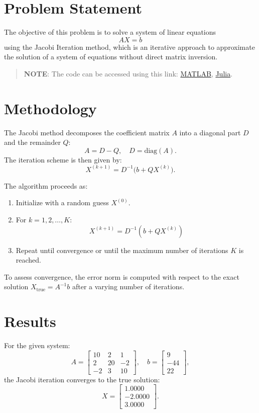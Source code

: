 \section*{Problem Statement}
The objective of this problem is to solve a system of linear equations
\[
  AX = b
\]
using the Jacobi Iteration method, which is an iterative approach to approximate the solution of a system of equations without direct matrix inversion.

\begin{quote}
  \textbf{NOTE}: The code can be accessed using this link: \href{https://raw.githubusercontent.com/HavokSahil/computational-techniques-assignments/refs/heads/main/assignment2/a4.m}{MATLAB}, \href{https://raw.githubusercontent.com/HavokSahil/computational-techniques-assignments/refs/heads/main/assignment2/a4.jl}{Julia}.
\end{quote}
\section*{Methodology}
The Jacobi method decomposes the coefficient matrix $A$ into a diagonal part $D$ and the remainder $Q$:
\[
  A = D - Q, \quad D = \text{diag}(A).
\]
The iteration scheme is then given by:
\[
  X^{(k+1)} = D^{-1} \big( b + Q X^{(k)} \big).
\]

The algorithm proceeds as:
\begin{enumerate}
  \item Initialize with a random guess $X^{(0)}$.
  \item For $k = 1, 2, \dots, K$:
    \[
      X^{(k+1)} = D^{-1}(b + QX^{(k)})
    \]
  \item Repeat until convergence or until the maximum number of iterations $K$ is reached.
\end{enumerate}

To assess convergence, the error norm is computed with respect to the exact solution $X_{\text{true}} = A^{-1}b$ after a varying number of iterations.

\section*{Results}
For the given system:
\[
A = \begin{bmatrix}
10 & 2 & 1 \\
2 & 20 & -2 \\
-2 & 3 & 10
\end{bmatrix}, \quad
b = \begin{bmatrix}
9 \\ -44 \\ 22
\end{bmatrix},
\]
the Jacobi iteration converges to the true solution:
\[
X = \begin{bmatrix}
1.0000 \\
-2.0000 \\
3.0000
\end{bmatrix}.
\]

